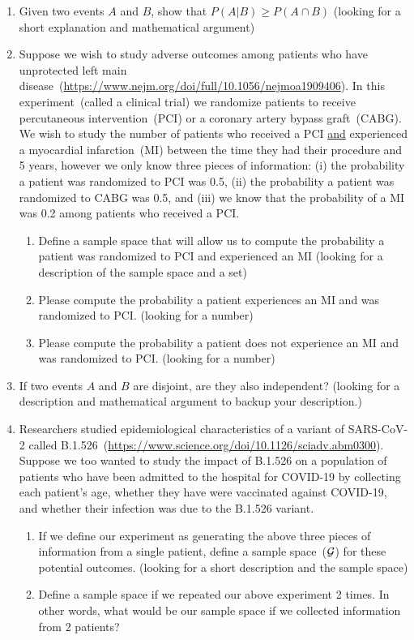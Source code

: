 \begin{enumerate}
   \item Given two events $A$ and $B$, show that $P(A|B) \geq P(A \cap B)$ (looking for a short explanation and mathematical argument)
   
   \item Suppose we wish to study adverse outcomes among patients who have unprotected left main disease~(\url{https://www.nejm.org/doi/full/10.1056/nejmoa1909406}). In this experiment~(called a clinical trial) we randomize patients to receive percutaneous intervention~(PCI) or a coronary artery bypass graft~(CABG). We wish to study the number of patients who received a PCI \underline{and} experienced a myocardial infarction~(MI) between the time they had their procedure and 5 years, however we only know three pieces of information: (i) the probability a patient was randomized to PCI was 0.5, (ii) the probability a patient was randomized to CABG was 0.5, and (iii) we know that the probability of a MI was 0.2 among patients who received a PCI.
   \begin{enumerate}
       \item Define a sample space that will allow us to compute the probability a patient was randomized to PCI and experienced an MI (looking for a description of the sample space and a set)
       \item Please compute the probability a patient experiences an MI and was randomized to PCI. (looking for a number)
       \item Please compute the probability a patient does not experience an MI and was randomized to PCI. (looking for a number)
   \end{enumerate}
   
   \item If two events $A$ and $B$ are disjoint, are they also independent? (looking for a description and mathematical argument to backup your description.)
   
   \item Researchers studied epidemiological characteristics of a variant of SARS-CoV-2 called B.1.526~(\url{https://www.science.org/doi/10.1126/sciadv.abm0300}). Suppose we too wanted to study the impact of B.1.526 on a population of patients who have been admitted to the hospital for COVID-19 by collecting each patient's age, whether they have were vaccinated against COVID-19, and whether their infection was due to the B.1.526 variant.
   
   \begin{enumerate}
       \item If we define our experiment as generating the above three pieces of information from a single patient, define a sample space~($\mathcal{G}$) for these potential outcomes. (looking for a short description and the sample space)
       \item Define a sample space if we repeated our above experiment 2 times. In other words, what would be our sample space if we collected information from 2 patients? 
   \end{enumerate}
    

\end{enumerate}
